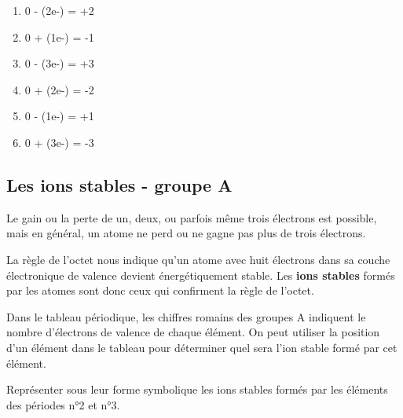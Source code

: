 \documentclass[
  11pt,
  a4paper,
  openany]{book}
\providecommand{\tightlist}{%
  \setlength{\itemsep}{0pt}\setlength{\parskip}{0pt}}
\begin{document}
\begin{Answer}

\begin{enumerate}
\def\labelenumi{\arabic{enumi}.}
\tightlist
\item
  0 - (2e-) = +2
\item
  0 + (1e-) = -1
\item
  0 - (3e-) = +3
\item
  0 + (2e-) = -2
\item
  0 - (1e-) = +1
\item
  0 + (3e-) = -3
\end{enumerate}

\newpage

\end{Answer}

\subsection{Les ions stables - groupe A}\label{les-ions-stables---groupe-a}

Le gain ou la perte de un, deux, ou parfois même trois électrons est possible, mais en général, un atome ne perd ou ne gagne pas plus de trois électrons.

La règle de l'octet nous indique qu'un atome avec huit électrons dans sa couche électronique de valence devient énergétiquement stable. Les \textbf{ions stables} formés par les atomes sont donc ceux qui confirment la règle de l'octet.

Dans le tableau périodique, les chiffres romains des groupes A indiquent le nombre d'électrons de valence de chaque élément. On peut utiliser la position d'un élément dans le tableau pour déterminer quel sera l'ion stable formé par cet élément.

\begin{Exercise}
Représenter sous leur forme symbolique les ions stables formés par les éléments des périodes n°2 et n°3.

\end{Exercise}
\end{document}
